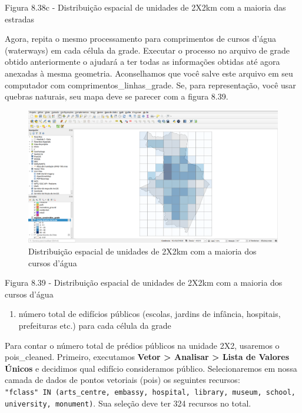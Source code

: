 \documentclass[
  portuguese,
]{krantz}
\providecommand{\tightlist}{%
  \setlength{\itemsep}{0pt}\setlength{\parskip}{0pt}}
\begin{document}
Figura 8.38c - Distribuição espacial de unidades de 2X2km com a maioria das estradas

Agora, repita o mesmo processamento para comprimentos de cursos d'água (waterways) \hspace{0pt}\hspace{0pt}em cada célula da grade. Executar o processo no arquivo de grade obtido anteriormente o ajudará a ter todas as informações obtidas até agora anexadas à mesma geometria. Aconselhamos que você salve este arquivo em seu computador com comprimentos\_linhas\_grade. Se, para representação, você usar quebras naturais, seu mapa deve se parecer com a figura 8.39.

\begin{figure}
\centering
\includegraphics{media/modulo8/fig839.png}
\caption{Distribuição espacial de unidades de 2X2km com a maioria dos cursos d'água}
\end{figure}

Figura 8.39 - Distribuição espacial de unidades de 2X2km com a maioria dos cursos d'água

\begin{enumerate}
\def\labelenumi{\arabic{enumi}.}
\setcounter{enumi}{2}
\tightlist
\item
  número total de edifícios públicos (escolas, jardins de infância, hospitais, prefeituras etc.) para cada célula da grade
\end{enumerate}

Para contar o número total de prédios públicos na unidade 2X2, usaremos o pois\_cleaned. Primeiro, executamos \textbf{Vetor \textgreater{} Analisar \textgreater{} Lista de Valores Únicos} e decidimos qual edifício consideramos público. Selecionaremos em nossa camada de dados de pontos vetoriais (pois) os seguintes recursos: \texttt{"fclass"\ IN\ (\textquotesingle{}arts\_centre\textquotesingle{},\ \textquotesingle{}embassy\textquotesingle{},\ \textquotesingle{}hospital\textquotesingle{},\ \textquotesingle{}library\textquotesingle{},\ \textquotesingle{}museum\textquotesingle{},\ \textquotesingle{}school\textquotesingle{},\ \textquotesingle{}university\textquotesingle{},\ \textquotesingle{}monument\textquotesingle{})}. Sua seleção deve ter 324 recursos no total.
\end{document}
